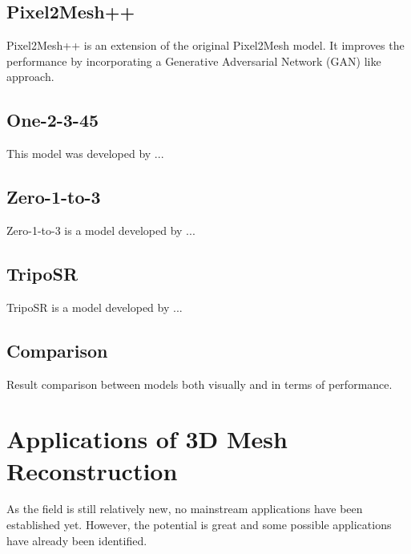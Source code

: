 \subsection{Pixel2Mesh++}
Pixel2Mesh++ \autocite{wen_pixel2mesh_2019} is an extension of the original Pixel2Mesh model. It improves the performance by incorporating a Generative Adversarial Network (GAN) like approach.

\subsection{One-2-3-45}
This model was developed by \textcite{liu_one-2-3-45_2023-1}...

\subsection{Zero-1-to-3}
Zero-1-to-3 is a model developed by \textcite{liu_zero-1--3_2023}...
\subsection{TripoSR}
TripoSR is a model developed by \textcite{tochilkin_triposr_2024}...

\subsection{Comparison}
Result comparison between models both visually and in terms of performance.

\section{Applications of 3D Mesh Reconstruction}
As the field is still relatively new, no mainstream applications have been established yet. However, the potential is great and some possible applications have already been identified.

